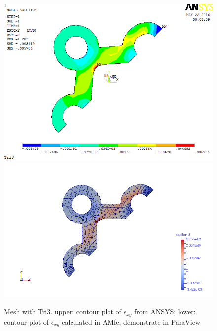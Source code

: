 \begin{figure}[htbp]
	\begin{center}
		\includegraphics[width=13cm,clip]{TTri3_Exy.png} 		
		\includegraphics[width=13cm,clip]{TTri3_Exy_P.png} 		
		\caption{Mesh with Tri3. upper: contour plot of $\epsilon_{xy}$ from ANSYS; lower: contour plot of $\epsilon_{xy}$ calculated in AMfe, demonstrate in ParaView} \label{fig: Tri3_Exy}
	\end{center}
\end{figure}
\clearpage 

